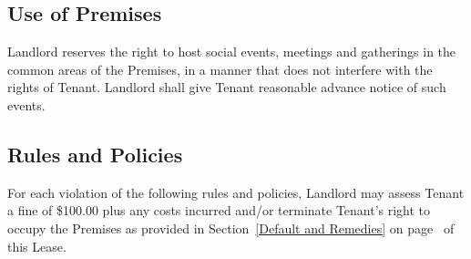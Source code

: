 \documentclass{article}
\begin{document}
\subsection{Use of Premises}
%
Landlord reserves the right to host social events,
meetings and gatherings in the common areas of the Premises, in a manner that
does not interfere with the rights of Tenant. Landlord shall give Tenant
reasonable advance notice of such events.

\subsection{Rules and Policies}
For each violation of the following rules and policies, Landlord may assess
Tenant a fine of \$100.00 plus any costs incurred and/or terminate Tenant’s
right to occupy the Premises as provided in Section~\ref{Default and Remedies}
on page~\pageref{Default and Remedies} of this Lease.
\end{document}
